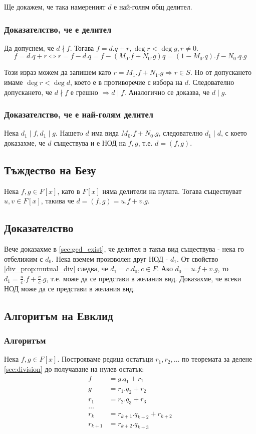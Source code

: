 \documentclass[fleqn,12pt]{article}
\begin{document}
Ще докажем, че така намереният $d$ е най-голям общ делител.

\subsubsection{Доказателство, че е делител}
Да допуснем, че $d \nmid f$. Тогава $f = d.q + r, \deg r < \deg g, r \neq 0$.
\[ f = d.q + r \Leftrightarrow r = f - d.q = 
f - (M_0 . f + N_0 . g)q = 
(1 - M_0 . q) . f - N_0 . q . g \]

Този израз можем да запишем като $r = M_1 . f + N_1 . g \Rightarrow r \in S$.
Но от допускането имаме $\deg r < \deg d$, което е в противоречие с избора на $d$.
Следователно допускането, че $d \nmid f$ е грешно $\Rightarrow d \mid f$.
Аналогично се доказва, че $d \mid g$.

\subsubsection{Доказателство, че е най-голям делител}
Нека $d_1 \mid f, d_1 \mid g$. Нашетo $d$ има вида $M_0.f + N_0.g$, следователно $d_1 \mid d$, с което
доказахме, че $d$ съществува и е НОД на $f,g$, т.е. $d = (f,g)$.

\subsection{Тъждество на Безу}
Нека $f,g \in F[x]$, като в $F[x]$ няма делители на нулата. Тогава съществуват $u,v \in F[x]$, такива че $d= (f,g) = u.f + v.g$.

\subsection{Доказателство}
Вече доказахме в \ref{sec:gcd_exist}, че делител в такъв вид съществува - нека го отбелижим с $d_0$. Нека вземем произволен 
друг НОД - $d_1$. От свойство \ref{div_prop:mutual_div} следва, че $d_1 = c . d_0, c \in F$. Ако $d_0 = u.f + v.g$, то 
$d_1 = \frac{u}{c} . f + \frac{v}{c} . g$, т.е. може да се представи в желания вид. Доказахме, че всеки НОД може да се 
представи в желания вид.

\subsection{Алгоритъм на Евклид}
\subsubsection{Алгоритъм}
Нека $f,g \in F[x]$. Построяваме редица остатъци $r_1, r_2, \dots$ по теоремата за делене \ref{sec:division} до получаване на нулев остатък:
\begin{align}
f &= g . q_1 + r_1 \\
g &= r_1 . q_2 + r_2 \\
r_1 &= r_2 . q_3 + r_3 \\
\dots \\
r_k &= r_{k + 1} . q_{k + 2} + r_{k + 2} \\
r_{k + 1} &= r_{k + 2} . q_{k + 3} \\
\end{align}
\end{document}
